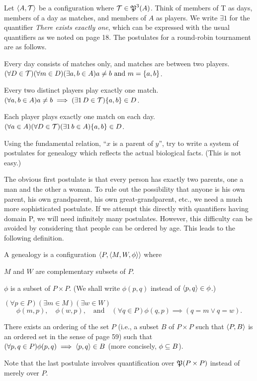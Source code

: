 \begin{solution}
Let $\left\langle A,\mathcal{T}\right\rangle$ be a configuration where $\mathcal{T} \in \operatorname{\mathfrak{P}}^3(A)$. Think of members of T as days,
members of a day as matches, and members of $A$ as players. We write $\exists 1$ for the quantifier
\textit{There exists exactly one}, which can be expressed with the usual quantifiers as we noted
on page 18. The postulates for a round-robin tournament are as follows.
\begin{enumroman}
    \item Every day consists of matches only, and matches are between two players.\\
        $(\forall D\in\mathcal{T})(\forall m\in D)(\exists a,b\in A)a\neq b\text{ and } m=\left\{a,b\right\}$.
    \item Every two distinct players play exactly one match.\\
        $(\forall a,b\in A)a\neq b\implies(\exists 1\thinspace D\in\mc T)\set{a,b}\in D$.
    \item Each player plays exactly one match on each day.\\
        $(\forall a\in A)(\forall D\in\mc T)(\exists 1\thinspace b\in A)\set{a,b}\in D$.
\end{enumroman}
\end{solution}

\begin{exercise}
Using the fundamental relation, ``$x$ is a parent of $y$'', try to write a system of
postulates for genealogy which reflects the actual biological facts. (This is not easy.)
\end{exercise}

\begin{solution}
The obvious first postulate is that every person has exactly two parents, one a man
and the other a woman. To rule out the possibility that anyone is his own parent, his own
grandparent, his own great-grandparent, etc., we need a much more sophisticated postulate.
If we attempt this directly with quantifiers having domain P, we will need infinitely
many postulates. However, this difficulty can be avoided by considering that people can
be ordered by age. This leads to the following definition.

A genealogy is a configuration $\left\langle P,\left\langle M, W,\phi\right\rangle\right\rangle$ where
\begin{enumroman}
    \item $M$ and $W$ are complementary subsets of $P$.
    \item $\phi$ is a subset of $P\times P$. (We shall write $\phi(p,q)$ instead of $\left\langle p,q\right\rangle\in\phi$.)
    \item $(\forall p\in P)(\exists m\in M)(\exists w\in W)$
        \[\phi(m, p),\quad \phi(w,p),\quad\text{and}\quad (\forall q\in P)\phi(q,p)\implies(q=m\lor q=w).\]
    \item There exists an ordering of the set $P$ (i.e., a subset $B$ of $P \times P$ such that $\left\langle P,B\right\rangle$
        is an ordered set in the sense of page 59) such that $(\forall p,q\in P)\phi(p,q)\implies\left\langle p,q\right\rangle\in B$
        (more concisely, $\phi\subseteq B$).
\end{enumroman}
Note that the last postulate involves quantification over $\operatorname{\mathfrak{P}}(P\times P)$ instead of merely
over $P$.
\end{solution}
